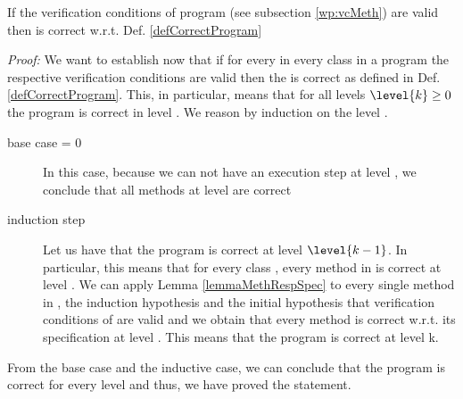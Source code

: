 \begin{vcGenCorrect1}
 If the verification conditions  of program \Program{} (see  subsection \ref{wp:vcMeth})
are valid then \Program{} is correct w.r.t. Def. \ref{defCorrectProgram}
\end{vcGenCorrect1}
\textit{Proof:}
We want to establish now  that if for every \methodd{}
 in every class \class{} in a program \Program{}  the respective verification conditions are valid then 
the \Program{} is correct as defined in Def. \ref{defCorrectProgram}.
 This, in particular, means that for all levels $\level{k} \ge 0 $ the program is correct in  level .
We reason by induction on the level . 
\begin{description} 
\item[base case  = 0]
 In this case, because we can not have an execution step at level , we conclude that all methods at level  
are correct
\item[induction step] Let us have that the program is correct at level $\level{k-1}$. 
In particular, this means that for every class \class{}, every method \methodd{} in \class{} is correct at level .
We can apply Lemma \ref{lemmaMethRespSpec} to every single method  \methodd{} in \Program{}, 
 the induction hypothesis  and the initial hypothesis that  verification conditions  of \methodd{} are valid and we obtain that 
every method  \methodd{} is correct w.r.t. its specification at level . This means that the program is correct at level k. 
\end{description}
From the base case and the inductive case, we can conclude that the program \Program{} is correct for every level  
and thus, we have proved the statement.
 
\Qed







